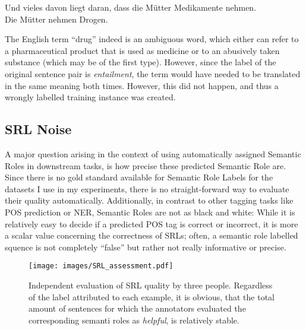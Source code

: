 {\begin{examples}
  \item Und vieles davon liegt daran, dass die Mütter Medikamente nehmen.\\
        Die Mütter nehmen Drogen.
\end{examples}

The English term ``drug'' indeed is an ambiguous word, which either can refer to a pharmaceutical
product that is used as medicine or to an abusively taken substance (which may be of the first
type). However, since
the label of the original sentence pair is \emph{entailment}, the term would have needed
to be translated in the same meaning both times. However, this did not happen, and thus
a wrongly labelled training instance was created.



\subsection{SRL Noise}
\label{sec:srl-noise}

A major question arising in the context of using automatically assigned Semantic
Roles in downstream tasks, is how precise these predicted Semantic Role are. Since
there is no gold standard available for Semantic Role Labels for the datasets I
use in my experiments, there is no straight-forward way to evaluate their quality
automatically. Additionally, in contrast to other tagging tasks like POS prediction
or NER, Semantic Roles are not as black and white: While it is relatively easy to
decide if a predicted POS tag is correct or incorrect, it is more a scalar value
concerning the correctness of SRLs; often, a semantic role labelled squence is not
completely ``false'' but rather not really informative or precise.

\begin{wrapfigure}[19]{l}{0.65\linewidth}
  \begin{center}
    \texttt{[image: images/SRL\_assessment.pdf]}
  \end{center}
  \caption[SRL assessment]{Independent evaluation of SRL quality by three people. Regardless of the
    label attributed to each example, it is obvious, that the total amount of sentences for which the
    annotators evaluated the corresponding semanti roles as \emph{helpful}, is relatively stable.}
    \label{fig:SRL-assessment}
\end{wrapfigure}

}
